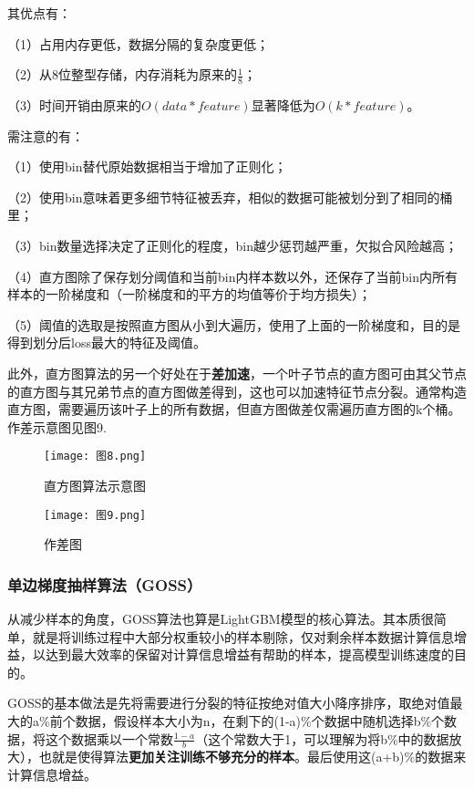 其优点有：

（1）占用内存更低，数据分隔的复杂度更低；

（2）从8位整型存储，内存消耗为原来的$\frac{1}{8}$；

（3）时间开销由原来的$O(data*\textit{feature})$显著降低为$O(k*feature)$。

需注意的有：

（1）使用bin替代原始数据相当于增加了正则化；

（2）使用bin意味着更多细节特征被丢弃，相似的数据可能被划分到了相同的桶里；

（3）bin数量选择决定了正则化的程度，bin越少惩罚越严重，欠拟合风险越高；

（4）直方图除了保存划分阈值和当前bin内样本数以外，还保存了当前bin内所有样本的一阶梯度和（一阶梯度和的平方的均值等价于均方损失）；

（5）阈值的选取是按照直方图从小到大遍历，使用了上面的一阶梯度和，目的是得到划分后loss最大的特征及阈值。

此外，直方图算法的另一个好处在于\textbf{差加速}，一个叶子节点的直方图可由其父节点的直方图与其兄弟节点的直方图做差得到，这也可以加速特征节点分裂。通常构造直方图，需要遍历该叶子上的所有数据，但直方图做差仅需遍历直方图的k个桶。作差示意图见图9.
\begin{figure}[h]
	\centering
	\begin{minipage}[b]{0.7\textwidth}
		\centering
		\texttt{[image: 图8.png]}
		\caption{直方图算法示意图}
		\label{fig:image1}
	\end{minipage}
	\hspace{0.05\textwidth} %
	\begin{minipage}[b]{0.7\textwidth}
		\centering
		\texttt{[image: 图9.png]}
		\caption{作差图}
		\label{fig:image2}
	\end{minipage}
\end{figure}
\subsubsection{单边梯度抽样算法（GOSS）}
从减少样本的角度，GOSS算法也算是LightGBM模型的核心算法。其本质很简单，就是将训练过程中大部分权重较小的样本剔除，仅对剩余样本数据计算信息增益，以达到最大效率的保留对计算信息增益有帮助的样本，提高模型训练速度的目的。

GOSS的基本做法是先将需要进行分裂的特征按绝对值大小降序排序，取绝对值最大的a\%前个数据，假设样本大小为n，在剩下的(1-a)\%个数据中随机选择b\%个数据，将这个数据乘以一个常数$\frac{1-a}b$（这个常数大于1，可以理解为将b\%中的数据放大），也就是使得算法\textbf{更加关注训练不够充分的样本}。最后使用这(a+b)\%的数据来计算信息增益。

